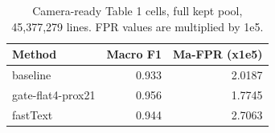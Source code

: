 \begin{table}[htbp]
\centering
\small
\begin{tabular}{lrr}
\toprule
\textbf{Method} & \textbf{Macro F1} & \textbf{Ma-FPR (x1e5)} \\
\midrule
baseline & 0.933 & 2.0187 \\
gate-flat4-prox21 & 0.956 & 1.7745 \\
fastText & 0.944 & 2.7063 \\
\bottomrule
\end{tabular}
\caption{Camera-ready Table 1 cells, full kept pool, 45,377,279 lines. FPR values are multiplied by 1e5.}
\label{tab:paper_eval_table1}
\end{table}
